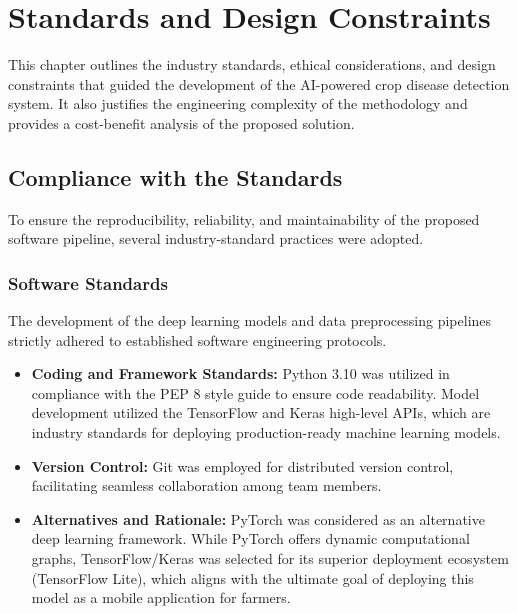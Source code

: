 \chapter{Standards and Design Constraints}

This chapter outlines the industry standards, ethical considerations, and design constraints that guided the development of the AI-powered crop disease detection system. It also justifies the engineering complexity of the methodology and provides a cost-benefit analysis of the proposed solution.

\section{Compliance with the Standards}

To ensure the reproducibility, reliability, and maintainability of the proposed software pipeline, several industry-standard practices were adopted. 

\subsection{Software Standards}
The development of the deep learning models and data preprocessing pipelines strictly adhered to established software engineering protocols. 
\begin{itemize}
    \item \textbf{Coding and Framework Standards:} Python 3.10 was utilized in compliance with the PEP 8 style guide to ensure code readability. Model development utilized the TensorFlow and Keras high-level APIs, which are industry standards for deploying production-ready machine learning models. 
    \item \textbf{Version Control:} Git was employed for distributed version control, facilitating seamless collaboration among team members.
    \item \textbf{Alternatives and Rationale:} PyTorch was considered as an alternative deep learning framework. While PyTorch offers dynamic computational graphs, TensorFlow/Keras was selected for its superior deployment ecosystem (TensorFlow Lite), which aligns with the ultimate goal of deploying this model as a mobile application for farmers.
\end{itemize}

